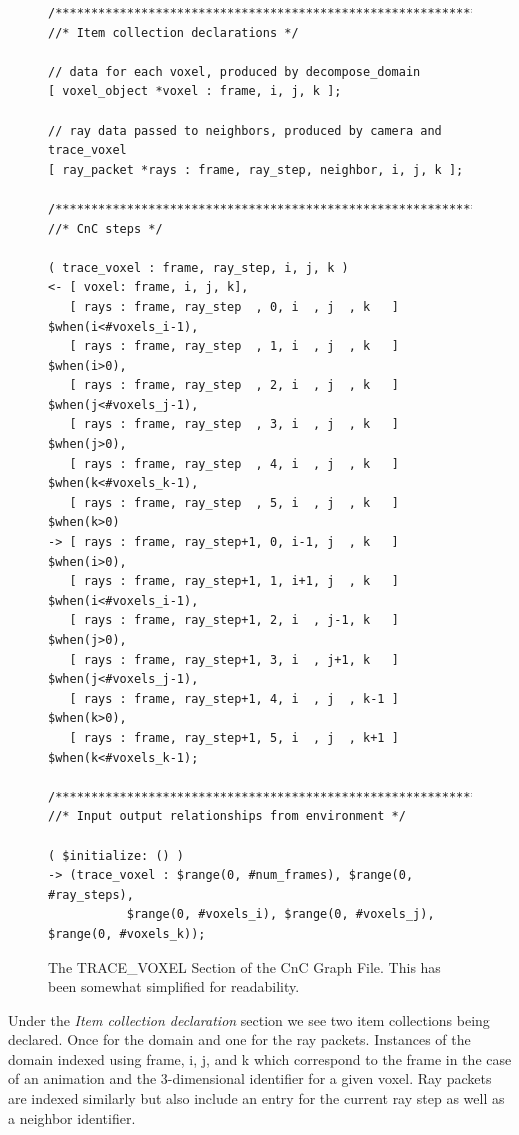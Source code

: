 \begin{figure}[t!]
  \begin{center}
    
\begin{lstlisting}[basicstyle=\ttfamily]
/******************************************************************************
//* Item collection declarations */

// data for each voxel, produced by decompose_domain
[ voxel_object *voxel : frame, i, j, k ];

// ray data passed to neighbors, produced by camera and trace_voxel
[ ray_packet *rays : frame, ray_step, neighbor, i, j, k ];

/******************************************************************************
//* CnC steps */

( trace_voxel : frame, ray_step, i, j, k )
<- [ voxel: frame, i, j, k],
   [ rays : frame, ray_step  , 0, i  , j  , k   ] $when(i<#voxels_i-1),
   [ rays : frame, ray_step  , 1, i  , j  , k   ] $when(i>0),
   [ rays : frame, ray_step  , 2, i  , j  , k   ] $when(j<#voxels_j-1),
   [ rays : frame, ray_step  , 3, i  , j  , k   ] $when(j>0),
   [ rays : frame, ray_step  , 4, i  , j  , k   ] $when(k<#voxels_k-1),
   [ rays : frame, ray_step  , 5, i  , j  , k   ] $when(k>0)
-> [ rays : frame, ray_step+1, 0, i-1, j  , k   ] $when(i>0),
   [ rays : frame, ray_step+1, 1, i+1, j  , k   ] $when(i<#voxels_i-1),
   [ rays : frame, ray_step+1, 2, i  , j-1, k   ] $when(j>0),
   [ rays : frame, ray_step+1, 3, i  , j+1, k   ] $when(j<#voxels_j-1),
   [ rays : frame, ray_step+1, 4, i  , j  , k-1 ] $when(k>0),
   [ rays : frame, ray_step+1, 5, i  , j  , k+1 ] $when(k<#voxels_k-1);

/******************************************************************************
//* Input output relationships from environment */

( $initialize: () )
-> (trace_voxel : $range(0, #num_frames), $range(0, #ray_steps),
           $range(0, #voxels_i), $range(0, #voxels_j), $range(0, #voxels_k));

\end{lstlisting} 
  \end{center}
  
  \caption{The TRACE\_VOXEL Section of the CnC Graph File. This has
    been somewhat simplified for readability.}
  \label{fig:tracevoxel}
\end{figure}

Under the \emph{Item collection declaration} section we see two item
collections being declared. Once for the domain and one for the ray
packets. Instances of the domain indexed using frame, i, j, and k
which correspond to the frame in the case of an animation and the
3-dimensional identifier for a given voxel. Ray packets are indexed
similarly but also include an entry for the current ray step as well
as a neighbor identifier.

